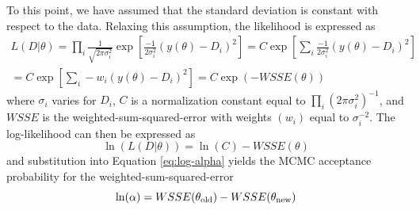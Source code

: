 \documentclass[preprint,review,11pt]{elsarticle}
\begin{document}
	To this point, we have assumed that the standard deviation is constant with respect to the data. Relaxing this assumption, the likelihood is expressed as
	\begin{multline} \label{eq:weighted-likelihood}
	L(D|\theta) = \prod_i \frac{1}{\sqrt{2 \pi \sigma_i^{2}}} \exp\left[\frac{-1}{2\sigma_i^2}(y(\theta)-D_i)^2\right] = C \exp\left[\sum_i\frac{-1}{2\sigma_i^2}(y(\theta)-D_i)^2\right] \\ = C \exp\left[\sum_i-w_i(y(\theta)-D_i)^2\right] = C \exp\left(-WSSE(\theta)\right)
	\end{multline}
	where $\sigma_i$ varies for $D_i$, $C$ is a normalization constant equal to $\prod_i (2 \pi \sigma_i^2)^{-1}$, and $WSSE$ is the weighted-sum-squared-error with weights $(w_i)$ equal to $\sigma_i^{-2}$. The log-likelihood can then be expressed as    
	\begin{equation} \label{eq:weighted-log-likelihood}
	\ln(L(D|\theta)) = \ln(C) - WSSE(\theta)
	\end{equation}
	and substitution into Equation \ref{eq:log-alpha} yields the MCMC acceptance probability for the weighted-sum-squared-error
	\begin{equation}
	\ln(\alpha) = WSSE(\theta_{\rm old}) - WSSE(\theta_{\rm new})
	\end{equation}
	
\end{document}
